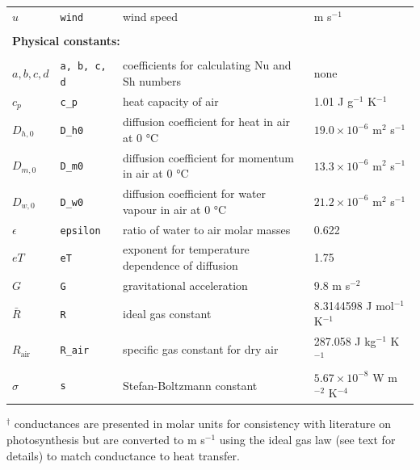 \documentclass[11pt, oneside]{article}
\newcommand{\code}[1]{{\texttt{#1}}}
\begin{document}
\begin{table}[ht]
\begin{center}
{\begin{tabular}{llll}
  $u$              & \code{wind}    & wind speed            & m s$^{-1}$ \\
  \\
  \multicolumn{4}{l}{\textbf{Physical constants:}} \\
  \\
  $a, b, c, d$     & \code{a, b, c, d} & coefficients for calculating $\mathrm{Nu}$ and $\mathrm{Sh}$ numbers & none \\
  $c_p$            & \code{c\_p}    & heat capacity of air & 1.01 J g$^{-1}$ K$^{-1}$ \\
  $D_{h,0}$        & \code{D\_h0}   & diffusion coefficient for heat in air at 0 °C & $19.0 \times 10^{-6}$ m$^2$ s$^{-1}$ \\
  $D_{m,0}$        & \code{D\_m0}   & diffusion coefficient for momentum in air at 0 °C & $13.3 \times 10^{-6}$ m$^2$ s$^{-1}$ \\
  $D_{w,0}$        & \code{D\_w0}   & diffusion coefficient for water vapour in air at 0 °C & $21.2 \times 10^{-6}$ m$^2$ s$^{-1}$ \\
  $\epsilon$       & \code{epsilon} & ratio of water to air molar masses & 0.622 \\
  $\mathit{eT}$    & \code{eT}      & exponent for temperature dependence of diffusion & 1.75 \\
  $G$              & \code{G}       & gravitational acceleration & 9.8 m s$^{-2}$ \\
  $\bar{R}$        & \code{R}       & ideal gas constant & 8.3144598 J mol$^{-1}$ K$^{-1}$ \\
  $R_\mathrm{air}$ & \code{R\_air}  & specific gas constant for dry air & 287.058 J kg$^{-1}$ K$^{-1}$ \\
  $\sigma$         & \code{s}       & Stefan-Boltzmann constant & $5.67 \times 10 ^ {-8}$ W m$^{-2}$ K$^{-4}$ \\

\bottomrule

\end{tabular}}
\end{center}
{$^\dagger$ conductances are presented in molar units for consistency with literature on photosynthesis but are converted to m s$^{-1}$ using the ideal gas law (see text for details) to match conductance to heat transfer.}

\label{table:table_input}
\end{table}
\end{document}
